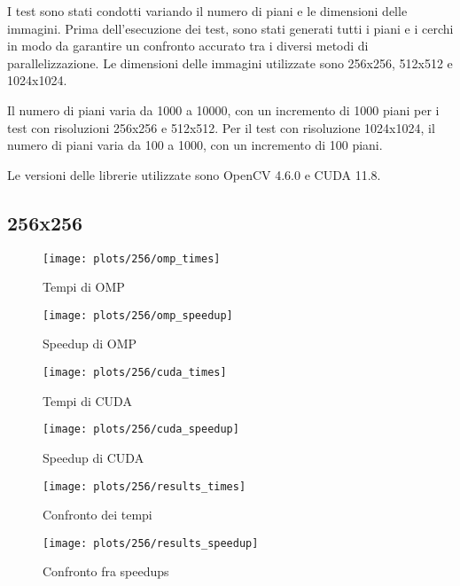 I test sono stati condotti variando il numero di piani e le dimensioni delle immagini.
Prima dell'esecuzione dei test, sono stati generati tutti i piani e i cerchi in modo da garantire un confronto accurato
tra i diversi metodi di parallelizzazione.
Le dimensioni delle immagini utilizzate sono 256x256, 512x512 e 1024x1024.

Il numero di piani varia da 1000 a 10000, con un incremento di 1000 piani per i test con risoluzioni 256x256 e 512x512.
Per il test con risoluzione 1024x1024, il numero di piani varia da 100 a 1000, con un incremento di 100 piani.

Le versioni delle librerie utilizzate sono OpenCV 4.6.0 e CUDA 11.8.

\subsection{256x256}\label{subsec:256x256}
\begin{figure}[H]
    \centering
    \begin{minipage}{0.49\textwidth}
        \centering
        \texttt{[image: plots/256/omp\_times]}
        \caption{Tempi di OMP}\label{fig:times-256-omp}
    \end{minipage}
    \begin{minipage}{0.49\textwidth}
        \centering
        \texttt{[image: plots/256/omp\_speedup]}
        \caption{Speedup di OMP}\label{fig:speedup-256-omp}
    \end{minipage}
\end{figure}

\begin{figure}[H]
    \centering
    \begin{minipage}{0.49\textwidth}
        \centering
        \texttt{[image: plots/256/cuda\_times]}
        \caption{Tempi di CUDA}\label{fig:times-256-cuda}
    \end{minipage}
    \begin{minipage}{0.49\textwidth}
        \centering
        \texttt{[image: plots/256/cuda\_speedup]}
        \caption{Speedup di CUDA}\label{fig:speedup-256-cuda}
    \end{minipage}
\end{figure}

\begin{figure}[H]
    \centering
    \begin{minipage}{0.49\textwidth}
        \centering
        \texttt{[image: plots/256/results\_times]}
        \caption{Confronto dei tempi}\label{fig:tempi-256}
    \end{minipage}
    \begin{minipage}{0.49\textwidth}
        \centering
        \texttt{[image: plots/256/results\_speedup]}
        \caption{Confronto fra speedups}\label{fig:speedups-256}
    \end{minipage}
\end{figure}

